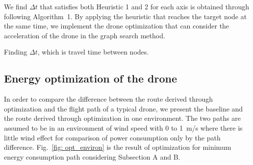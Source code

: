 \documentclass[journal]{./template/IEEEtran}
\begin{document}
We find $\Delta t$ that satisfies both Heuristic 1 and 2 for each axis is obtained through following Algorithm~1. By applying the heuristic that reaches the target node at the same time, we implement the drone optimization that can consider the acceleration of the drone in the graph search method.

\begin{algorithm}[ht]
 \caption{Finding $\Delta t$, which is travel time between nodes.}
\end{algorithm}

\subsection{Energy optimization of the drone}

In order to compare the difference between the route derived through optimization and the flight path of a typical drone, we present the baseline and the route derived through optimization in one environment.
The two paths are assumed to be in an environment of wind speed with 0 to 1~m/s where there is little wind effect for comparison of power consumption only by the path difference.
Fig.~\ref{fig: opt_environ} is the result of optimization for minimum energy consumption path considering Subsection A and B.
\end{document}
